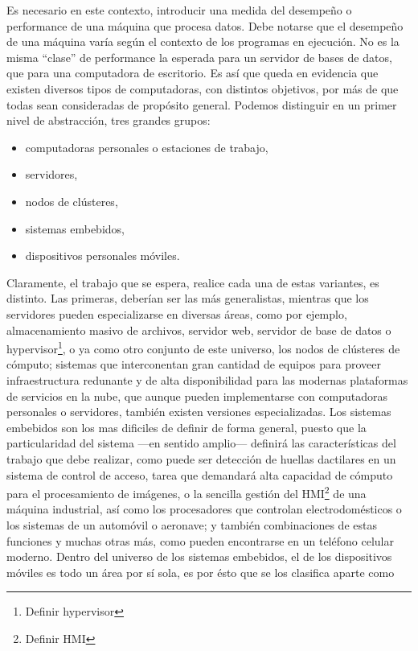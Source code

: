Es necesario en este contexto, introducir una medida del desempeño o 
performance de una máquina que procesa datos. Debe notarse que el desempeño de 
una máquina varía según el contexto de los programas en ejecución. No es la 
misma ``clase'' de performance la esperada para un servidor de bases de datos, 
que para una computadora de escritorio. Es así que queda en evidencia que 
existen diversos tipos de computadoras, con distintos objetivos, por más de que 
todas sean consideradas de propósito general. Podemos distinguir en un primer 
nivel de abstracción, tres grandes grupos:
\begin{itemize}
  \item computadoras personales o estaciones de trabajo,
  \item servidores,
  \item nodos de clústeres,
  \item sistemas embebidos,
  \item dispositivos personales móviles.
\end{itemize}
Claramente, el trabajo que se espera, realice cada una de estas variantes, es 
distinto. Las primeras, deberían ser las más generalistas, mientras que los 
servidores pueden especializarse en diversas áreas, como por ejemplo, 
almacenamiento masivo de archivos, servidor web, servidor de base de datos o 
hypervisor\footnote{Definir hypervisor}, o ya como otro conjunto de este 
universo, los nodos de clústeres de cómputo; sistemas que interconentan gran 
cantidad de equipos para proveer infraestructura redunante y de alta 
disponibilidad para las modernas plataformas de servicios en la nube, que 
aunque pueden implementarse con computadoras personales o servidores, también 
existen versiones especializadas. Los sistemas embebidos son los mas dificiles 
de definir de forma general, puesto que la particularidad del sistema ---en 
sentido amplio--- definirá las características del trabajo que debe realizar, 
como puede ser detección de huellas dactilares en un sistema de control de 
acceso, tarea que demandará alta capacidad de cómputo para el procesamiento de 
imágenes, o la sencilla gestión del HMI\footnote{Definir HMI} de una máquina 
industrial, así como los procesadores que controlan electrodomésticos o los 
sistemas de un automóvil o aeronave; y también combinaciones de estas funciones 
y muchas otras más, como pueden encontrarse en un teléfono celular moderno. 
Dentro del universo de los sistemas embebidos, el de los dispositivos móviles es 
todo un área por sí sola, es por ésto que se los clasifica aparte como 
